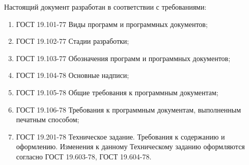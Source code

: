 Настоящий документ разработан в соответствии с требованиями:
\begin{enumerate}[1)]
	\item ГОСТ 19.101-77 Виды программ и программных документов;
	\item ГОСТ 19.102-77 Стадии разработки;
	\item ГОСТ 19.103-77 Обозначения программ и программных документов;
	\item ГОСТ 19.104-78 Основные надписи;
	\item ГОСТ 19.105-78 Общие требования к программным документам;
	\item ГОСТ 19.106-78 Требования к программным документам, выполненным печатным способом;
	\item ГОСТ 19.201-78 Техническое задание. Требования к содержанию и оформлению. Изменения к данному Техническому заданию оформляются согласно ГОСТ 19.603-78, ГОСТ 19.604-78.
\end{enumerate}

\clearpage